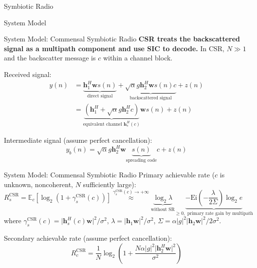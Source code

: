 \documentclass[9pt]{beamer}
\begin{document}
\begin{section}{Symbiotic Radio}
\begin{subsection}{System Model}
			\begin{frame}{System Model: Commensal Symbiotic Radio}
				\textbf{CSR treats the backscattered signal as a multipath component and use SIC to decode.} In CSR, $N \gg 1$ and the backscatter message is $c$ within a channel block.

				\vspace{1em}

				Received signal:
				\begin{align}
					y(n)
					&= \underbrace{\boldsymbol{h}_1^H \boldsymbol{w} s(n)}_{\text{direct signal}} + \underbrace{\sqrt{\alpha}g \boldsymbol{h}_2^H \boldsymbol{w} s(n)c}_{\text{backscattered signal}} + z(n)\\
					&= \underbrace{\left(\boldsymbol{h}_1^H+\sqrt{\alpha}g \boldsymbol{h}_2^H c\right)}_{\text{equivalent channel }\boldsymbol{h}_s^H(c)} \boldsymbol{w} s(n) + z(n)
				\end{align}

				Intermediate signal (assume perfect cancellation):
				\begin{equation}
					y_{b}(n)=\sqrt{\alpha}g \boldsymbol{h}_2^H \boldsymbol{w}\underbrace{s(n)}_{\text{spreading code}}c + z(n)
				\end{equation}
			\end{frame}

			\begin{frame}{System Model: Commensal Symbiotic Radio}
				Primary achievable rate ($c$ is unknown, noncoherent, $N$ sufficiently large):
				\begin{equation}
					R_{s}^{\text{CSR}}=\mathbb{E}_{c}\left[\log_2{\left(1+\gamma_s^{\text{CSR}}(c)\right)}\right]
					\overset{\gamma_s^{\text{CSR}}(c) \to +\infty}{\approx} \underbrace{\log_2{\lambda}}_{\text{without SR}} \underbrace{- \mathrm{Ei}\left(-\frac{\lambda}{2\Sigma}\right) \log_2{e}}_{\ge 0,\text{ primary rate gain by multipath}}
				\end{equation}
				where $\gamma_s^{\text{CSR}}(c)={\lvert{\boldsymbol{h}_s^H(c)\boldsymbol{w}}\rvert^2}/{\sigma^2}$, $\lambda={\lvert{\boldsymbol{h}_1\boldsymbol{w}}\rvert^2}/{\sigma^2}$, $\Sigma={\alpha\lvert{g}\rvert^2\lvert{\boldsymbol{h}_2\boldsymbol{w}}\rvert^2}/{2\sigma^2}$.

				\vspace{1em}

				Secondary achievable rate (assume perfect cancellation):
				\begin{equation}
					R_{c}^{\text{CSR}}=\frac{1}{N}\log_2{\left(1+\frac{N\alpha\lvert{g}\rvert^2\lvert{\boldsymbol{h}_2^H\boldsymbol{w}}\rvert^2}{\sigma^2}\right)}
				\end{equation}


\end{frame}
\end{subsection}
\end{section}
\end{document}
